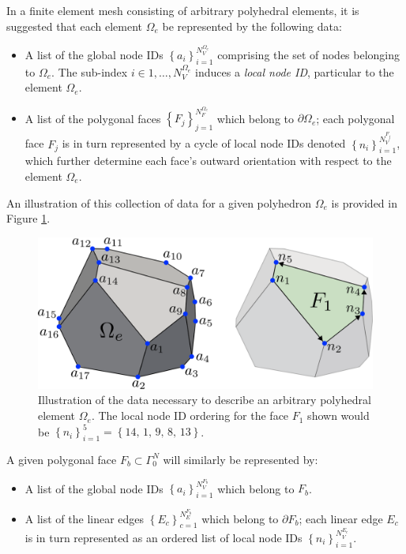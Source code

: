 	In a finite element mesh consisting of arbitrary polyhedral elements, it is suggested that each element $\Omega_e$ be represented by the following data:
	\begin{itemize}
		\item A list of the global node IDs $\left\{ a_i \right\}_{i=1}^{N^{\Omega_e}_V}$ comprising the set of nodes belonging to $\Omega_e$. The sub-index $i \in 1, \ldots, N^{\Omega_e}_V$ induces a \textit{local node ID}, particular to the element $\Omega_e$.
		\item A list of the polygonal faces $\left\{ F_{j} \right\}_{j=1}^{N^{\Omega_e}_F}$ which belong to $\partial \Omega_e$; each polygonal face $F_j$ is in turn represented by a cycle of local node IDs denoted $\left\{ n_i \right\}_{i=1}^{N^{F_j}_V}$, which further determine each face's outward orientation with respect to the element $\Omega_e$.
	\end{itemize}
	An illustration of this collection of data for a given polyhedron $\Omega_e$ is provided in Figure \ref{fig:polyhedron_data}.
	\begin{figure} [!ht]
		\centering
		\includegraphics[width = 6.0in]{figures/polyhedron_data.pdf}
		\caption{Illustration of the data necessary to describe an arbitrary polyhedral element $\Omega_e$. The local node ID ordering for the face $F_1$ shown would be $\left\{ n_i \right\}_{i=1}^{5} = \left\{ 14, \, 1, \, 9, \, 8, \, 13 \right\}$.}
		\label{fig:polyhedron_data}
	\end{figure}
	
	A given polygonal face $F_b \subset \Gamma^N_0$ will similarly be represented by:
	\begin{itemize}
		\item A list of the global node IDs $\left\{ a_i \right\}_{i=1}^{N^{F_b}_V}$ which belong to $F_b$.
		\item A list of the linear edges $\left\{ E_{c} \right\}_{c=1}^{N^{F_b}_E}$ which belong to $\partial F_b$; each linear edge $E_c$ is in turn represented as an ordered list of local node IDs $\left\{ n_i \right\}_{i=1}^{N^{E_c}_V}$.
	\end{itemize}
	
